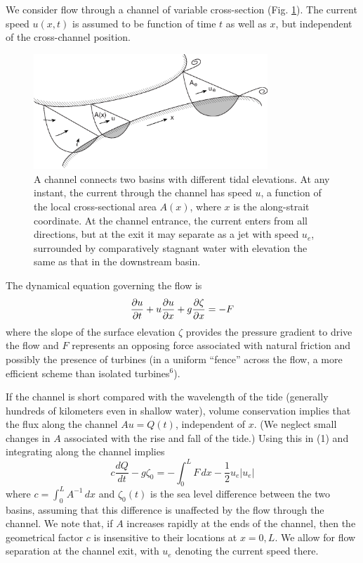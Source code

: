 \documentclass[11pt]{article}
\begin{document}
We consider flow through a channel of variable cross-section (Fig. \ref{ChannelFigure}).  The current speed $u(x,t)$ is  assumed to be function of time $t$ as well as $x$, but independent of the cross-channel position.
\begin{figure}
\centerline{\includegraphics[width=250pt]{Channel_i5b.eps}}
\caption{\footnotesize A channel connects two basins with different tidal elevations. At any instant, the current through the channel has speed $u$, a function of the local cross-sectional area $A(x)$, where $x$ is the along-strait coordinate. At the channel entrance,  the current enters from all directions, but at the exit it may separate as a jet with speed $u_e$, surrounded by comparatively stagnant water with elevation the same as that in the downstream basin.}
\label{ChannelFigure}
\end{figure}
The dynamical equation governing the flow is
\begin{equation}
\frac{\partial u}{\partial t} + u\frac{\partial u}{\partial x} + g\frac{\partial \zeta}{\partial x} = - F
\end{equation}
where the slope of the surface elevation $\zeta$ provides the pressure gradient to drive the flow and $F$ represents an opposing force associated with natural friction and possibly the presence of turbines (in a uniform ``fence'' across the flow, a more efficient scheme than isolated turbines$^6$).

If the channel is short compared with the wavelength of the tide (generally hundreds of kilometers even in shallow water), volume conservation implies that the flux along the channel $Au=Q(t)$, independent of $x$. (We neglect small changes in $A$ associated with the rise and fall of the tide.) Using this in (1) and integrating  along the channel implies
\begin{equation}
c\frac{dQ}{dt} - g \zeta_0 = -\int_0^L F \, dx - \frac{1}{2} u_e |u_e|
\end{equation}
where $c = \int_0^L A^{-1} \, dx$ and $\zeta_0(t)$ is the sea level difference between the two basins, assuming that this difference is unaffected by the flow through the channel. We note that, if $A$ increases rapidly at the ends of the channel, then the geometrical factor $c$ is insensitive to their locations at $x = 0, L$. We allow for flow separation at the channel exit, with $u_e$ denoting the current speed there.
\end{document}
